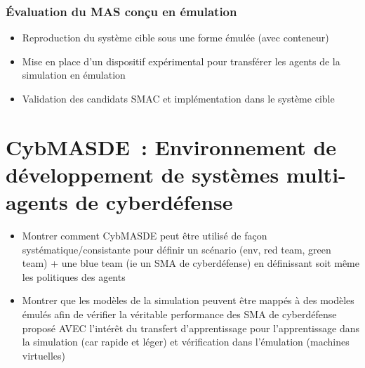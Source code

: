 \subsubsection{Évaluation du MAS conçu en émulation}
\begin{itemize}

    \item Reproduction du système cible sous une forme émulée (avec conteneur)
    \item Mise en place d'un dispositif expérimental pour transférer les agents de la simulation en émulation
    \item Validation des candidats SMAC et implémentation dans le système cible

\end{itemize}

\section{CybMASDE : Environnement de développement de systèmes multi-agents de cyberdéfense}\label{sec:cybmasde}

\begin{itemize}

    \item Montrer comment CybMASDE peut être utilisé de façon systématique/consistante pour définir un scénario (env, red team, green team) + une blue team (ie un SMA de cyberdéfense) en définissant soit même les politiques des agents
    \item Montrer que les modèles de la simulation peuvent être mappés à des modèles émulés afin de vérifier la véritable performance des SMA de cyberdéfense proposé AVEC l'intérêt du transfert d'apprentissage pour l'apprentissage dans la simulation (car rapide et léger) et vérification dans l'émulation (machines virtuelles)
\end{itemize}